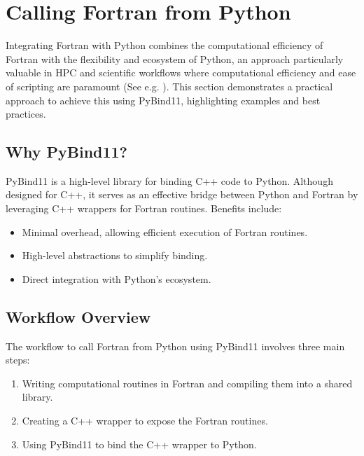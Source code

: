 % 

\section{Calling Fortran from Python}

Integrating Fortran with Python combines the computational efficiency of Fortran with the flexibility and ecosystem of Python, an approach particularly valuable in HPC and scientific workflows where computational efficiency and ease of scripting are paramount (See e.g. \cite{pyhpc2016_slides, langtangen2006fortran, arabas2014formula, 790589}). This section demonstrates a practical approach to achieve this using PyBind11, highlighting examples and best practices.

\subsection{Why PyBind11?}
PyBind11 is a high-level library for binding C++ code to Python. Although designed for C++, it serves as an effective bridge between Python and Fortran by leveraging C++ wrappers for Fortran routines. Benefits include:
\begin{itemize}
    \item Minimal overhead, allowing efficient execution of Fortran routines.
    \item High-level abstractions to simplify binding.
    \item Direct integration with Python's ecosystem.
\end{itemize}

\subsection{Workflow Overview}
The workflow to call Fortran from Python using PyBind11 involves three main steps:
\begin{enumerate}
    \item Writing computational routines in Fortran and compiling them into a shared library.
    \item Creating a C++ wrapper to expose the Fortran routines.
    \item Using PyBind11 to bind the C++ wrapper to Python.
\end{enumerate}

